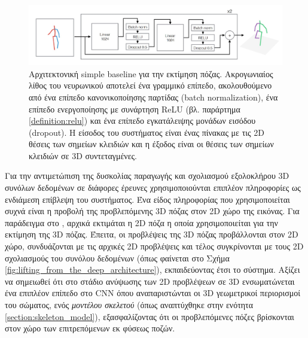 \begin{figure}[h]
    \centering
    \includegraphics[scale=0.5]{images/chapter2/3d_pose_estimation/simple_baseline_architecture.jpg}
    \caption[Αρχιτεκτονική simple baseline για την εκτίμηση πόζας]{Αρχιτεκτονική simple baseline για την εκτίμηση πόζας. Ακρογωνιαίος λίθος του νευρωνικού αποτελεί ένα γραμμικό επίπεδο, ακολουθούμενο από ένα επίπεδο κανονικοποίησης παρτίδας (batch normalization), ένα επίπεδο ενεργοποίησης με συνάρτηση ReLU (βλ. παράρτημα \ref{definition:relu}) και ένα επίπεδο εγκατάλειψης μονάδων εισόδου (dropout). Η είσοδος του συστήματος είναι ένας πίνακας με τις 2D θέσεις των σημείων κλειδιών και η έξοδος είναι οι θέσεις των σημείων κλειδιών σε 3D συντεταγμένες.}
    \label{fig:simple_baseline}
\end{figure}

Για την αντιμετώπιση της δυσκολίας παραγωγής και σχολιασμού εξολοκλήρου 3D συνόλων δεδομένων σε διάφορες έρευνες χρησιμοποιούνται επιπλέον πληροφορίες ως ενδιάμεση επίβλεψη του συστήματος. Ένα είδος πληροφορίας που χρησιμοποιείται συχνά είναι η προβολή της προβλεπόμενης 3D πόζας στον 2D χώρο της εικόνας. Για παράδειγμα στο \cite{lifting_from_the_deep}, αρχικά εκτιμάται η 2D πόζα η οποία χρησιμοποιείται για την εκτίμηση της 3D πόζας. Έπειτα, οι προβλέψεις της 3D πόζας προβάλλονται στον 2D χώρο, συνδυάζονται με τις αρχικές 2D προβλέψεις και τέλος συγκρίνονται με τους 2D σχολιασμούς του συνόλου δεδομένων (όπως φαίνεται στο Σχήμα \ref{fig:lifting_from_the_deep_architecture}), εκπαιδεύοντας έτσι το σύστημα. Αξίζει να σημειωθεί ότι στο στάδιο ανύψωσης των 2D προβλέψεων σε 3D ενσωματώνεται ένα επιπλέον επίπεδο στο CNN όπου αναπαριστώνται οι 3D γεωμετρικοί περιορισμοί του σώματος, ενός \textsl{μοντέλου σκελετού} (όπως αναπτύχθηκε στην ενότητα \ref{section:skeleton_model}), εξασφαλίζοντας ότι οι προβλεπόμενες πόζες βρίσκονται στον χώρο των επιτρεπόμενων εκ φύσεως ποζών. 

